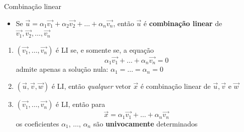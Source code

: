 \begin{frame}{Combinação linear}
    \begin{itemize}
        \item Se \(\vec{u}=\alpha_1 \vec{v_1} +\alpha_2 \vec{v_2} + \ldots +\alpha_n \vec{v_n}\), então
            \(\vec{u}\) é \textbf{combinação linear} de \(\vec{v_1}, \vec{v_2}, \ldots, \vec{v_n}\)
    \end{itemize}

    \vspace{0.5cm}
    \begin{tcolorbox}[colback=red!10, center title, title= \textit{Teoremas demonstrados no livro texto}]

        \begin{enumerate}
            \item \((\vec{v_1},\ldots,\vec{v_n})\) é LI se, e somente se, a equação
                \[
                    \alpha_1 \vec{v_1}+\ldots+\alpha_n \vec{v_n}=0
                \]
                admite apenas a solução nula: \(\alpha_1=\ldots=\alpha_n=0\)
            \item \((\vec{u}, \vec{v}, \vec{w})\) é LI, então \textit{qualquer} vetor \(\vec{x}\) é combinação linear de \(\vec{u}, \vec{v} \text{ e } \vec{w}\)
            \item \((\vec{v_1},\ldots, \vec{v_n})\) é LI, então para
                \[
                    \vec{x} = \alpha_1 \vec{v_1}+\ldots+\alpha_n \vec{v_n}
                \]
                os coeficientes \(\alpha_1\), \(\ldots\), \(\alpha_n\) são \textbf{univocamente} determinados
        \end{enumerate}
    \end{tcolorbox}
\end{frame}

